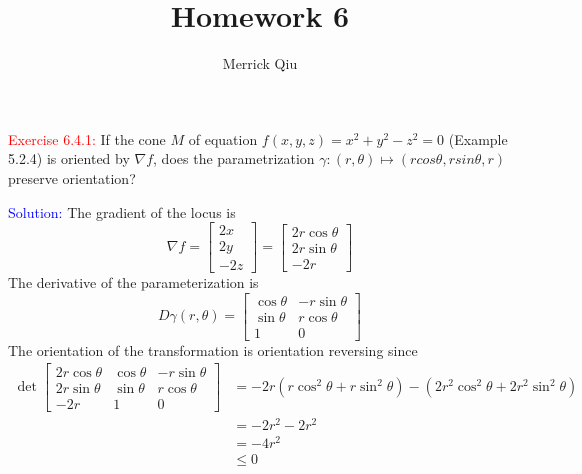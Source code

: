 \documentclass[12pt]{article}
\title{Homework 6}
\author{Merrick Qiu}
\date{}
\begin{document}
\maketitle
\newpage

\textcolor{red}{Exercise 6.4.1:}
If the cone $M$ of equation $f(x,y,z) = x^2+y^2-z^2=0$ (Example 5.2.4) is oriented by $\nabla f$, does the parametrization $\gamma:(r,\theta)\mapsto (rcos\theta,rsin\theta,r)$ preserve orientation?

\bigskip

\textcolor{blue}{Solution:}
    The gradient of the locus is 
    \[
        \nabla f =
        \begin{bmatrix}
            2x \\
            2y \\
            -2z
        \end{bmatrix} = 
        \begin{bmatrix}
            2r\cos \theta \\
            2r\sin \theta \\
            -2r
        \end{bmatrix}
    \]
    The derivative of the parameterization is 
    \[
        D\gamma(r, \theta) =
        \begin{bmatrix}
            \cos \theta & -r\sin \theta\\
            \sin \theta & r\cos \theta \\
            1 & 0 
        \end{bmatrix}
    \]
    The orientation of the transformation is orientation reversing since
    \begin{align*}
        \det 
        \begin{bmatrix}
            2r\cos \theta & \cos \theta & -r\sin \theta\\
            2r\sin \theta & \sin \theta & r\cos \theta \\
            -2r & 1 & 0 
        \end{bmatrix} 
        &= -2r(r\cos^2 \theta + r\sin^2 \theta) -(2r^2\cos^2 \theta + 2r^2\sin^2 \theta) \\
        &= -2r^2 - 2r^2 \\
        &= -4r^2 \\
        &\leq 0
    \end{align*}
        
\newpage
\end{document}
